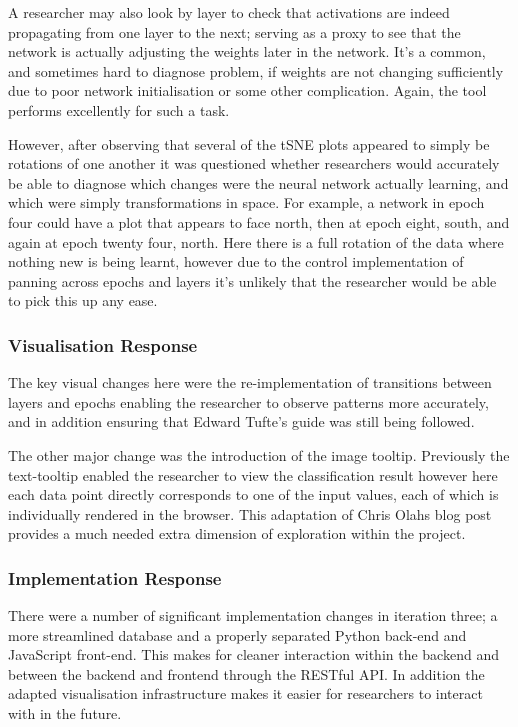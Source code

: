 \documentclass[a4paper,11pt,titlepage]{article}
\begin{document}
		A researcher may also look by layer to check that activations are indeed propagating from one layer to the next; serving as a proxy to see that the network is actually adjusting the weights later in the network. It's a common, and sometimes hard to diagnose problem, if weights are not changing sufficiently due to poor network initialisation or some other complication. Again, the tool performs excellently for such a task.
		\par 
		However, after observing that several of the tSNE plots appeared to simply be rotations of one another it was questioned whether researchers would accurately be able to diagnose which changes were the neural network actually learning, and which were simply transformations in space. For example, a network in epoch four could have a plot that appears to face north, then at epoch eight, south, and again at epoch twenty four, north. Here there is a full rotation of the data where nothing new is being learnt, however due to the control implementation of panning across epochs and layers it's unlikely that the researcher would be able to pick this up any ease. 	
		
		\subsubsection{Visualisation Response}
		The key visual changes here were the re-implementation of transitions between layers and epochs enabling the researcher to observe patterns more accurately, and in addition ensuring that Edward Tufte's guide was still being followed.
		\par 
		The other major change was the introduction of the image tooltip. Previously the text-tooltip enabled the researcher to view the classification result however here each data point directly corresponds to one of the input values, each of which is individually rendered in the browser. This adaptation of Chris Olahs blog post provides a much needed extra dimension of exploration within the project.
	\subsubsection{Implementation Response}
	There were a number of significant implementation changes in iteration three; a more streamlined database and a properly separated Python back-end and JavaScript front-end. This makes for cleaner interaction within the backend and between the backend and frontend through the RESTful API. In addition the adapted visualisation infrastructure makes it easier for researchers to interact with in the future.
	
\end{document}
